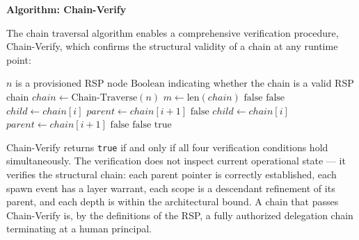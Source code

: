 \medskip
\noindent\textbf{Algorithm: Chain-Verify}

The chain traversal algorithm enables a comprehensive verification procedure, Chain-Verify, which confirms the structural validity of a chain at any runtime point:

\begin{algorithm}
\caption{Chain-Verify($n$) --- Verify the authorization chain from node $n$ to human anchor}
\label{alg:chain-verify}
\begin{algorithmic}[1]
\REQUIRE $n$ is a provisioned RSP node
\ENSURE $\text{Boolean}$ indicating whether the chain is a valid RSP chain
\STATE $chain \leftarrow \text{Chain-Traverse}(n)$
\STATE $m \leftarrow \text{len}(chain)$
\STATE {}
    \STATE \RETURN $\text{false}$ 
\ENDIF
{}
    \STATE \RETURN $\text{false}$ 
\ENDIF
\STATE {}
    \STATE $child \leftarrow chain[i]$
    \STATE $parent \leftarrow chain[i+1]$
        \STATE \RETURN $\text{false}$ 
    \ENDIF
\ENDFOR
\STATE {}
    \STATE $child \leftarrow chain[i]$
    \STATE $parent \leftarrow chain[i+1]$
        \STATE \RETURN $\text{false}$ 
    \ENDIF
\ENDFOR
\STATE {}
        \STATE \RETURN $\text{false}$ 
    \ENDIF
\ENDFOR
\RETURN $\text{true}$
\end{algorithmic}
\end{algorithm}

Chain-Verify returns \texttt{true} if and only if all four verification conditions hold simultaneously. The verification does not inspect current operational state --- it verifies the structural chain: each parent pointer is correctly established, each spawn event has a \purpose{} layer warrant, each scope is a descendant refinement of its parent, and each depth is within the architectural bound. A chain that passes Chain-Verify is, by the definitions of the RSP, a fully authorized delegation chain terminating at a human principal.

